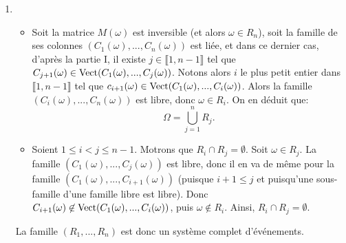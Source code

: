 \begin{enumerate}
 \item \begin{itemize}
            \item[\textbullet] Soit la matrice $M(\omega)$ est inversible (et alors $\omega \in R_{n}$), soit la famille de ses colonnes $(C_{1}(\omega), ..., C_{n}(\omega))$ est liée, et dans ce dernier cas, d'après la partie I, il existe $j\in \llbracket 1, n-1\rrbracket$ tel que  $C_{j+1}(\omega) \in \operatorname{Vect}(C_{1}(\omega), ..., C_{j}(\omega))$. Notons alors $i$ le plus petit entier dans $\llbracket 1, n-1\rrbracket$ tel que $c_{i+1}(\omega)\in \operatorname{Vect}(C_{1}(\omega), ..., C_{i}(\omega))$.
 Alors la famille $(C_{i}(\omega), ..., C_{n}(\omega))$ est libre, donc $\omega \in R_{i}$. On en déduit que:
 \[ \Omega = \bigcup_{j=1}^{n}R_{j}.\]
            \item[\textbullet] Soient $1\leq i < j \leq n-1$. Motrons que $R_{i}\cap R_{j} = \emptyset$. Soit $\omega \in R_{j}$. La famille $(C_{1}(\omega), ..., C_{j}(\omega))$ est libre, donc il en va de même pour la famille
            $(C_{1}(\omega), ..., C_{i+1}(\omega))$ (puisque $i+1 \leq j$ et puisqu'une sous-famille d'une famille libre est libre). Donc $C_{i+1}(\omega)\not \in \operatorname{Vect}(C_{1}(\omega), ..., C_{i}(\omega))$, puis $\omega \not \in R_{i}$.
            Ainsi, $R_{i}\cap R_{j} = \emptyset$.
           \end{itemize}

           La famille $(R_{1}, ..., R_{n})$ est donc un système complet d'événements.
 

\end{enumerate}
